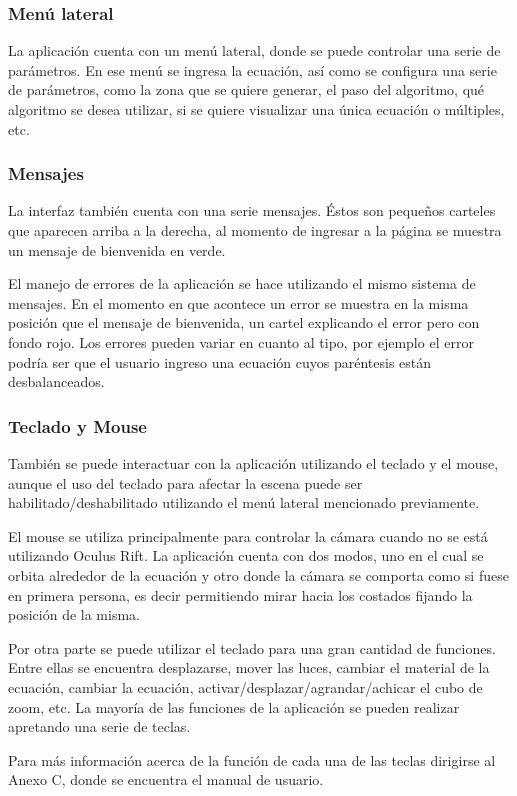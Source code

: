 \documentclass[12pt]{article}
\begin{document}
\subsubsection{Menú lateral}
\noindent La aplicación cuenta con un menú lateral, donde se puede controlar una serie de parámetros. En ese menú se ingresa la ecuación, así como se configura una serie de parámetros, como la zona que se quiere generar, el paso del algoritmo, qué algoritmo se desea utilizar, si se quiere visualizar una única ecuación o múltiples, etc. 
\subsubsection{Mensajes}
\noindent La interfaz también cuenta con una serie mensajes. Éstos son pequeños carteles que aparecen arriba a la derecha, al momento de ingresar a la página se muestra un mensaje de bienvenida en verde. 

El manejo de errores de la aplicación se hace utilizando el mismo sistema de mensajes. En el momento en que acontece un error se muestra en la misma posición que el mensaje de bienvenida, un cartel explicando el error pero con fondo rojo. Los errores pueden variar en cuanto al tipo, por ejemplo el error podría ser que el usuario ingreso una ecuación cuyos paréntesis están desbalanceados.
\subsubsection{Teclado y Mouse}
\noindent También se puede interactuar con la aplicación utilizando el teclado y el mouse, aunque el uso del teclado para afectar la escena puede ser habilitado/deshabilitado utilizando el menú lateral mencionado previamente.

El mouse se utiliza principalmente para controlar la cámara cuando no se está utilizando Oculus Rift. La aplicación cuenta con dos modos, uno en el cual se orbita alrededor de la ecuación y otro donde la cámara se comporta como si fuese en primera persona, es decir permitiendo mirar hacia los costados fijando la posición de la misma.

Por otra parte se puede utilizar el teclado para una gran cantidad de funciones. Entre ellas se encuentra desplazarse, mover las luces, cambiar el material de la ecuación, cambiar la ecuación, activar/desplazar/agrandar/achicar el cubo de zoom, etc. La mayoría de las funciones de la aplicación se pueden realizar apretando una serie de teclas.

Para más información acerca de la función de cada una de las teclas dirigirse al Anexo C, donde se encuentra el manual de usuario.
\end{document}
